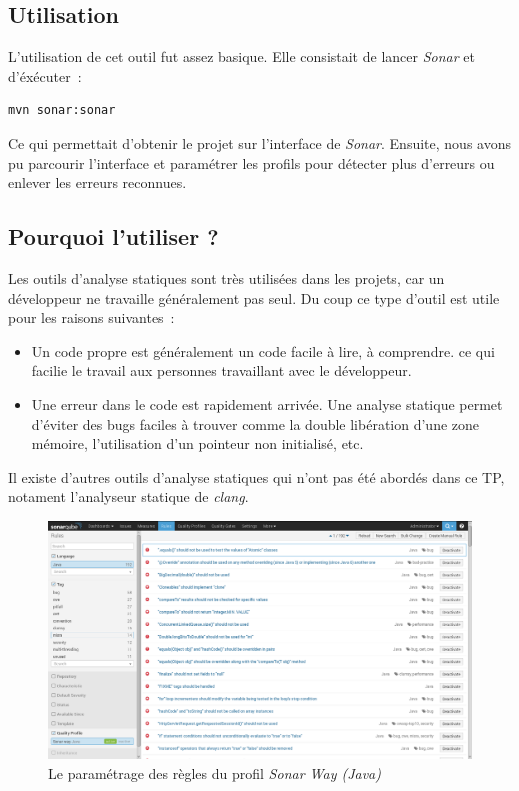 \documentclass{article}
\begin{document}
\subsection{Utilisation}
L'utilisation de cet outil fut assez basique. Elle consistait de lancer \emph{Sonar} et d'éxécuter~:
\begin{verbatim}
mvn sonar:sonar
\end{verbatim}
Ce qui permettait d'obtenir le projet sur l'interface de \emph{Sonar}. Ensuite, nous avons pu parcourir l'interface et paramétrer les profils pour détecter plus d'erreurs ou enlever les erreurs reconnues.
\subsection{Pourquoi l'utiliser ?}
Les outils d'analyse statiques sont très utilisées dans les projets, car un développeur ne travaille généralement pas seul. Du coup ce type d'outil est utile pour les raisons suivantes~:
\begin{itemize}
	\item Un code propre est généralement un code facile à lire, à comprendre. ce qui facilie le travail aux personnes travaillant avec le développeur.
	\item Une erreur dans le code est rapidement arrivée. Une analyse statique permet d'éviter des bugs faciles à trouver comme la double libération d'une zone mémoire, l'utilisation d'un pointeur non initialisé, etc.
\end{itemize}
Il existe d'autres outils d'analyse statiques qui n'ont pas été abordés dans ce TP, notament l'analyseur statique de \emph{clang}.
\begin{figure}
	\begin{center}
		\includegraphics[scale=0.3]{img/sonarqube}
		\caption{Le paramétrage des règles du profil \emph{Sonar Way (Java)}}
		\label{fig:Sonarqube}
	\end{center}
\end{figure}
\end{document}

